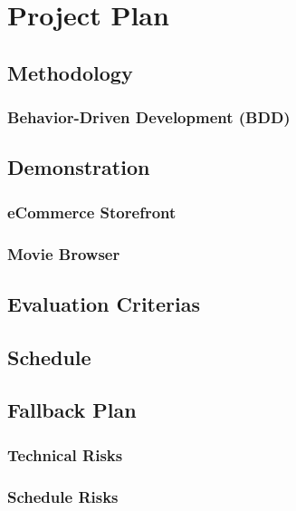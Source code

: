 \chapter{Project Plan}

\section{Methodology}

\subsection{Behavior-Driven Development (BDD)}


\section{Demonstration}


\subsection{eCommerce Storefront}


\subsection{Movie Browser}


\section{Evaluation Criterias}


\section{Schedule}


\section{Fallback Plan}

\subsection{Technical Risks}

\subsection{Schedule Risks}

